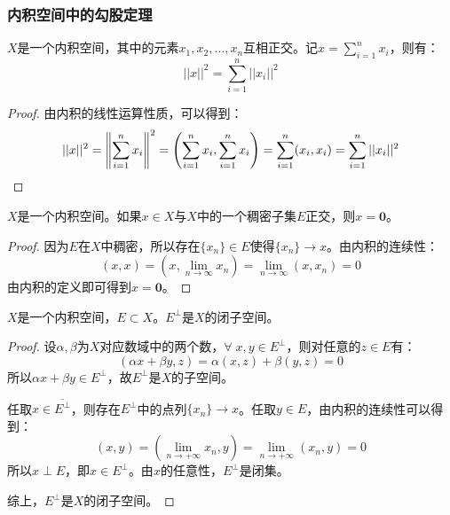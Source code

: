 \subsubsection{内积空间中的勾股定理}
\begin{theorem}
	$X$是一个内积空间，其中的元素$x_1,x_2,\dots,x_n$互相正交。记$x=\sum\limits_{i=1}^nx_i$，则有：
	\begin{equation*}
		||x||^2=\sum_{i=1}^{n}||x_i||^2
	\end{equation*}
\end{theorem}
\begin{proof}
	由内积的线性运算性质，可以得到：
	\begin{equation*}
		||x||^2
		=\left\|\sum_{i=1}^nx_i\right\|^2
		=\left(\sum_{i=1}^nx_i,\sum_{i=1}^nx_i\right)
		=\sum_{i=1}^{n}(x_i,x_i)
		=\sum_{i=1}^{n}||x_i||^2\qedhere
	\end{equation*}
\end{proof}
\begin{theorem}
	$X$是一个内积空间。如果$x\in X$与$X$中的一个稠密子集$E$正交，则$x=\mathbf{0}$。
\end{theorem}
\begin{proof}
	因为$E$在$X$中稠密，所以存在$\{x_n\}\in E$使得$\{x_n\}\to x$。由内积的连续性：
	\begin{equation*}
		(x,x)=\left(x,\lim_{n\to\infty}x_n\right)=\lim_{n\to\infty}(x,x_n)=0
	\end{equation*}
	由内积的定义即可得到$x=\mathbf{0}$。
\end{proof}
\begin{theorem}
	$X$是一个内积空间，$E\subset X$。$E^{\perp}$是$X$的闭子空间。
\end{theorem}
\begin{proof}
	设$\alpha,\beta$为$X$对应数域中的两个数，$\forall\;x,y\in E^{\perp}$，则对任意的$z\in E$有：
	\begin{equation*}
		(\alpha x+\beta y,z)=\alpha(x,z)+\beta(y,z)=0
	\end{equation*}
	所以$\alpha x+\beta y\in E^{\perp}$，故$E^{\perp}$是$X$的子空间。\par
	任取$x\in\overline{E^{\perp}}$，则存在$E^{\perp}$中的点列$\{x_n\}\to x$。任取$y\in E$，由内积的连续性可以得到：
	\begin{equation*}
		(x,y)=\left(\lim_{n\to+\infty}x_n,y\right)=\lim_{n\to+\infty}(x_n,y)=0
	\end{equation*}
	所以$x\perp E$，即$x\in E^{\perp}$。由$x$的任意性，$E^{\perp}$是闭集。\par
	综上，$E^{\perp}$是$X$的闭子空间。
\end{proof}

